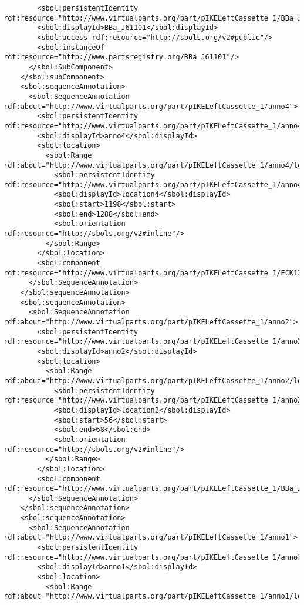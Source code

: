 \begin{lstlisting}
        <sbol:persistentIdentity rdf:resource="http://www.virtualparts.org/part/pIKELeftCassette_1/BBa_J61101"/>
        <sbol:displayId>BBa_J61101</sbol:displayId>
        <sbol:access rdf:resource="http://sbols.org/v2#public"/>
        <sbol:instanceOf rdf:resource="http://www.partsregistry.org/BBa_J61101"/>
      </sbol:SubComponent>
    </sbol:subComponent>
    <sbol:sequenceAnnotation>
      <sbol:SequenceAnnotation rdf:about="http://www.virtualparts.org/part/pIKELeftCassette_1/anno4">
        <sbol:persistentIdentity rdf:resource="http://www.virtualparts.org/part/pIKELeftCassette_1/anno4"/>
        <sbol:displayId>anno4</sbol:displayId>
        <sbol:location>
          <sbol:Range rdf:about="http://www.virtualparts.org/part/pIKELeftCassette_1/anno4/location4">
            <sbol:persistentIdentity rdf:resource="http://www.virtualparts.org/part/pIKELeftCassette_1/anno4/location4"/>
            <sbol:displayId>location4</sbol:displayId>
            <sbol:start>1198</sbol:start>
            <sbol:end>1288</sbol:end>
            <sbol:orientation rdf:resource="http://sbols.org/v2#inline"/>
          </sbol:Range>
        </sbol:location>
        <sbol:component rdf:resource="http://www.virtualparts.org/part/pIKELeftCassette_1/ECK120029600"/>
      </sbol:SequenceAnnotation>
    </sbol:sequenceAnnotation>
    <sbol:sequenceAnnotation>
      <sbol:SequenceAnnotation rdf:about="http://www.virtualparts.org/part/pIKELeftCassette_1/anno2">
        <sbol:persistentIdentity rdf:resource="http://www.virtualparts.org/part/pIKELeftCassette_1/anno2"/>
        <sbol:displayId>anno2</sbol:displayId>
        <sbol:location>
          <sbol:Range rdf:about="http://www.virtualparts.org/part/pIKELeftCassette_1/anno2/location2">
            <sbol:persistentIdentity rdf:resource="http://www.virtualparts.org/part/pIKELeftCassette_1/anno2/location2"/>
            <sbol:displayId>location2</sbol:displayId>
            <sbol:start>56</sbol:start>
            <sbol:end>68</sbol:end>
            <sbol:orientation rdf:resource="http://sbols.org/v2#inline"/>
          </sbol:Range>
        </sbol:location>
        <sbol:component rdf:resource="http://www.virtualparts.org/part/pIKELeftCassette_1/BBa_J61101"/>
      </sbol:SequenceAnnotation>
    </sbol:sequenceAnnotation>
    <sbol:sequenceAnnotation>
      <sbol:SequenceAnnotation rdf:about="http://www.virtualparts.org/part/pIKELeftCassette_1/anno1">
        <sbol:persistentIdentity rdf:resource="http://www.virtualparts.org/part/pIKELeftCassette_1/anno1"/>
        <sbol:displayId>anno1</sbol:displayId>
        <sbol:location>
          <sbol:Range rdf:about="http://www.virtualparts.org/part/pIKELeftCassette_1/anno1/location1">

\end{lstlisting}
